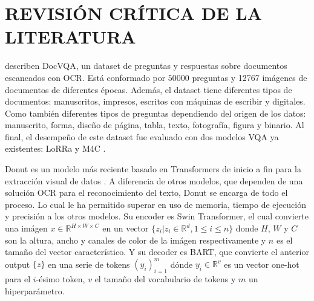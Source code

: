 \documentclass[../main.tex]{subfiles}
\begin{document}
\chapter{REVISIÓN CRÍTICA DE LA LITERATURA}


\citet{mathew2021docvqa} describen DocVQA,
un dataset de preguntas y respuestas sobre documentos escaneados con OCR.
Está conformado por $50000$ preguntas y 12767 imágenes de documentos de diferentes épocas.
Además, el dataset tiene diferentes tipos de documentos:
manuscritos, impresos, escritos con máquinas de escribir y digitales.
Como también diferentes tipos de preguntas dependiendo del origen de los datos:
manuscrito, forma, diseño de página, tabla, texto, fotografía, figura y binario.
Al final, el desempeño de este dataset fue evaluado con dos modelos VQA ya existentes:
LoRRa \cite{anderson2018bottomup} y M4C \cite{devlin2019bert}.

%

Donut es un modelo más reciente basado en Transformers de inicio a fin para la extracción visual de datos \cite{kim2022ocrfree}.
A diferencia de otros modelos, que dependen de una solución OCR para el reconocimiento del texto,
Donut se encarga de todo el proceso.
Lo cual le ha permitido superar en uso de memoria, tiempo de ejecución y precisión a los otros modelos.
Su encoder es Swin Transformer\cite{9710580}, el cual convierte una imágen $x \in \mathbb{R}^{H\times W \times C}$ en un vector $\{z_i|z_i\in\mathbb{R}^d,1\leq i \leq n\}$ donde $H$, $W$ y $C$ son la altura, ancho y canales de color de la imágen respectivamente y $n$ es el tamaño del vector característico.
Y su decoder es BART\cite{lewis-etal-2020-bart}, que convierte el anterior output $\{z\}$ en una serie de tokens $(y_i)^m_{i=1}$ dónde $y_i\in\mathbb{R}^v$ es un vector one-hot para el $i$-ésimo token, $v$ el tamaño del vocabulario de tokens y $m$ un hiperparámetro.
\end{document}
